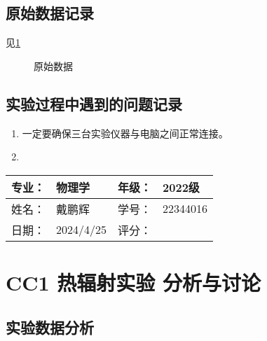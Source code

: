 \documentclass[dvipsnames, svgnames,a4paper,11pt]{article}
\begin{document}



\subsection{原始数据记录}

	见\cref{fig:data}

	\begin{figure}[htbp]
		\centering
		\quad


		\caption{原始数据}
		\label{fig:data}
	\end{figure}



\subsection{实验过程中遇到的问题记录}

\begin{enumerate}
	\item 一定要确保三台实验仪器与电脑之间正常连接。
	\item 
	
\end{enumerate}
	

\clearpage
\begin{table}
	\renewcommand\arraystretch{1.7}
	\begin{tabularx}{\textwidth}{|X|X|X|X|}
	\hline
	专业：& 物理学 &年级：& 2022级\\
	\hline
	姓名： & 戴鹏辉 & 学号：& 22344016\\
	\hline
    日期：& 2024/4/25 & 评分： &\\
	\hline
	\end{tabularx}
\end{table}

\section{CC1 \quad 热辐射实验 \quad\heiti 分析与讨论}

\subsection{实验数据分析}
\end{document}
